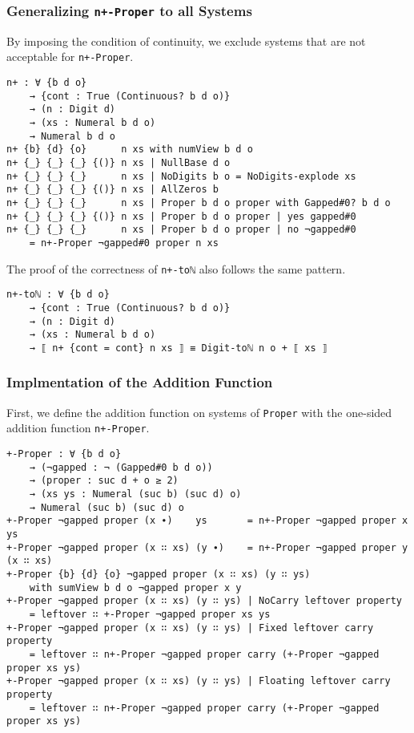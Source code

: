 \documentclass[\main/thesis.tex]{subfiles}
\begin{document}
\subsubsection{Generalizing \lstinline|n+-Proper| to all Systems}

By imposing the condition of continuity, we exclude systems that are not
acceptable for \lstinline|n+-Proper|.

\begin{lstlisting}[basicstyle=\ttfamily\scriptsize]
n+ : ∀ {b d o}
    → {cont : True (Continuous? b d o)}
    → (n : Digit d)
    → (xs : Numeral b d o)
    → Numeral b d o
n+ {b} {d} {o}      n xs with numView b d o
n+ {_} {_} {_} {()} n xs | NullBase d o
n+ {_} {_} {_}      n xs | NoDigits b o = NoDigits-explode xs
n+ {_} {_} {_} {()} n xs | AllZeros b
n+ {_} {_} {_}      n xs | Proper b d o proper with Gapped#0? b d o
n+ {_} {_} {_} {()} n xs | Proper b d o proper | yes gapped#0
n+ {_} {_} {_}      n xs | Proper b d o proper | no ¬gapped#0
    = n+-Proper ¬gapped#0 proper n xs
\end{lstlisting}

The proof of the correctness of \lstinline|n+-toℕ| also follows the same pattern.

\begin{lstlisting}
n+-toℕ : ∀ {b d o}
    → {cont : True (Continuous? b d o)}
    → (n : Digit d)
    → (xs : Numeral b d o)
    → ⟦ n+ {cont = cont} n xs ⟧ ≡ Digit-toℕ n o + ⟦ xs ⟧
\end{lstlisting}

\subsubsection{Implmentation of the Addition Function}

First, we define the addition function on systems of \lstinline|Proper| with
the one-sided addition function \lstinline|n+-Proper|.

\begin{lstlisting}[basicstyle=\ttfamily\scriptsize]
+-Proper : ∀ {b d o}
    → (¬gapped : ¬ (Gapped#0 b d o))
    → (proper : suc d + o ≥ 2)
    → (xs ys : Numeral (suc b) (suc d) o)
    → Numeral (suc b) (suc d) o
+-Proper ¬gapped proper (x ∙)    ys       = n+-Proper ¬gapped proper x ys
+-Proper ¬gapped proper (x ∷ xs) (y ∙)    = n+-Proper ¬gapped proper y (x ∷ xs)
+-Proper {b} {d} {o} ¬gapped proper (x ∷ xs) (y ∷ ys)
    with sumView b d o ¬gapped proper x y
+-Proper ¬gapped proper (x ∷ xs) (y ∷ ys) | NoCarry leftover property
    = leftover ∷ +-Proper ¬gapped proper xs ys
+-Proper ¬gapped proper (x ∷ xs) (y ∷ ys) | Fixed leftover carry property
    = leftover ∷ n+-Proper ¬gapped proper carry (+-Proper ¬gapped proper xs ys)
+-Proper ¬gapped proper (x ∷ xs) (y ∷ ys) | Floating leftover carry property
    = leftover ∷ n+-Proper ¬gapped proper carry (+-Proper ¬gapped proper xs ys)
\end{lstlisting}
\end{document}
